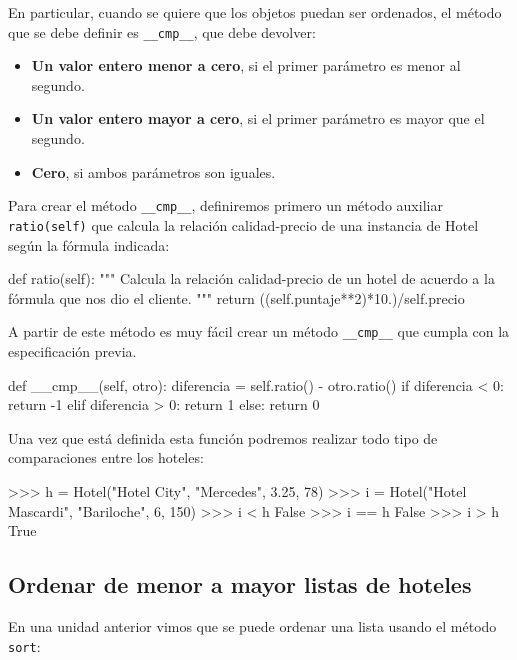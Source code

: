 En particular, cuando se quiere que los objetos puedan ser ordenados, el
método que se debe definir es \lstinline!__cmp__!, que debe devolver:

\begin{itemize}
\item {\bf Un valor entero menor a cero}, si el primer parámetro es menor al
segundo.
\item {\bf Un valor entero mayor a cero}, si el primer parámetro es mayor
que el segundo.
\item {\bf Cero}, si ambos parámetros son iguales.
\end{itemize}

Para crear el método \lstinline!__cmp__!, definiremos primero un método
auxiliar \lstinline!ratio(self)! que calcula la relación calidad-precio de
una instancia de Hotel según la fórmula indicada:

\begin{codigo-python-sn}
    def ratio(self):
        """ Calcula la relación calidad-precio de un hotel de acuerdo
            a la fórmula que nos dio el cliente. """
        return ((self.puntaje**2)*10.)/self.precio
\end{codigo-python-sn}

A partir de este método es muy fácil crear un método \lstinline!__cmp__!
que cumpla con la especificación previa.

\begin{codigo-python-sn}
    def __cmp__(self, otro):
        diferencia = self.ratio() - otro.ratio()
        if diferencia < 0:
            return -1
        elif diferencia > 0:
            return 1
        else:
            return 0
\end{codigo-python-sn}

Una vez que está definida esta función podremos realizar todo tipo de
comparaciones entre los hoteles:

\begin{codigo-python-sn}
>>> h = Hotel("Hotel City", "Mercedes", 3.25, 78)
>>> i = Hotel("Hotel Mascardi", "Bariloche", 6, 150)
>>> i < h
False
>>> i == h
False
>>> i > h
True
\end{codigo-python-sn}

\subsection{Ordenar de menor a mayor listas de hoteles}

En una unidad anterior vimos que se puede ordenar una lista usando el
método \lstinline!sort!:

